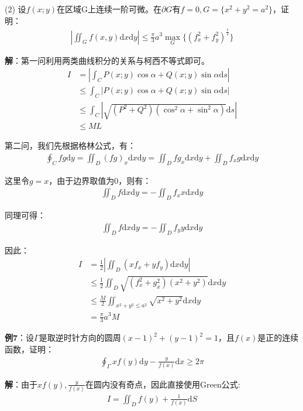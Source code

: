 \documentclass{ctexart}
\let\oldtextbf\textbf
\renewcommand{\textbf}[1]{\textcolor{brown!50!red}{\oldtextbf{#1}}}
\begin{document}
(2) 设$f(x;y)$在区域G上连续一阶可微。在$\partial G$有$f=0,G=\{x^2+y^2=a^2\}$，证明：
\begin{align*}
    \left | \iint_Gf(x,y)\mathrm{d}x\mathrm{d}y\right | \leq \frac{\pi}{3}a^3\max_G\{(f_x^2+f_y^2)^{\frac{1}{2} }\} 
\end{align*}

\textbf{\color{brown!50!red}解}：第一问利用两类曲线积分的关系与柯西不等式即可。
\begin{align*}
I&=\left | \int_CP(x;y)\cos\alpha+Q(x;y)\sin\alpha \mathrm{d}s  \right |\\
 &\leq\int_C\left| P(x;y)\cos\alpha+Q(x;y)\sin\alpha \mathrm{d}s \right | \\
&\leq\int_C\left| \sqrt{(P^2+Q^2)(\cos^2\alpha+\sin^2\alpha) }\mathrm{d}s \right |\\
&\leq ML
\end{align*}

第二问，我们先根据格林公式，有：
\begin{align*}
\oint_Cfg\mathrm{d}y=\iint_D(fg)_x\mathrm{d}x\mathrm{d}y=\iint_Dfg_x\mathrm{d}x\mathrm{d}y
+\iint_Df_xg\mathrm{d}x\mathrm{d}y
\end{align*}

这里令$g=x$，由于边界取值为0，则有：
\begin{align*}
\iint_Df\mathrm{d}x\mathrm{d}y
=-\iint_Df_xx\mathrm{d}x\mathrm{d}y
\end{align*}

同理可得：
\begin{align*}
\iint_Df\mathrm{d}x\mathrm{d}y
=-\iint_Df_yy\mathrm{d}x\mathrm{d}y
\end{align*}

因此：
\begin{align*}
I&=\frac{1}{2} \left |\iint_D(xf_x+yf_y)\mathrm{d}x\mathrm{d}y  \right | \\
&\leq\frac{1}{2}\iint_D\sqrt{(f_x^2+g_x^2)(x^2+y^2)}\mathrm{d}x\mathrm{d}y\\
&\leq\frac{M}{2}\iint_{x^2+y^2\leq a^2}    \sqrt{x^2+y^2}\mathrm{d}x\mathrm{d}y
\\&=\frac{\pi}{3}a^3M
\end{align*}

\textbf{例7}：设$\Gamma$是取逆时针方向的圆周$(x-1)^2+(y-1)^2=1$，且$f(x)$是正的连续函数，证明：
\begin{align*}
    \oint_{\Gamma}xf(y)\mathrm{d}y-\frac{y}{f(x)}\mathrm{d}x\geq 2\pi
\end{align*}

\textbf{解}：由于$xf(y),\frac{y}{f(x)}$在圆内没有奇点，因此直接使用Green公式:
\begin{align*}
    I=\iint_D f(y)+\frac{1}{f(x)}\mathrm{d}S
\end{align*}
\end{document}
